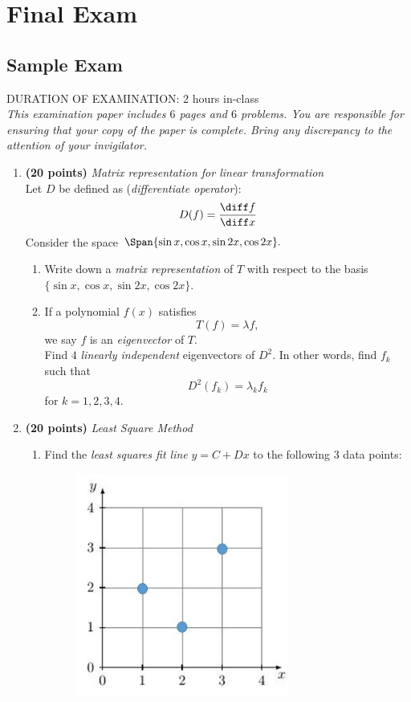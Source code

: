 

\chapter{Final Exam}

\section{Sample Exam}
DURATION OF EXAMINATION: 2 hours in-class\\
\textit{This examination paper includes $6$ pages and $6$ problems. You are responsible for ensuring that
your copy of the paper is complete. Bring any discrepancy to the attention of your invigilator.}\\
\begin{enumerate}
\item \textbf{(20 points)} \textit{Matrix representation for linear transformation}\\
Let $D$ be defined as (\textit{differentiate operator}):
\[
D(f)=\frac{\diff f}{\diff x}
\]
Consider the space $\Span\{\sin x,\cos x,\sin 2x,\cos 2x\}.$
\begin{enumerate}
\item
Write down a \textit{matrix representation} of $T$ with respect to the basis $\{\sin x,\cos x,\sin 2x,\cos 2x\}.$\\
\item
If a polynomial $f(x)$ satisfies
\[
T(f)=\lambda f,
\]
we say $f$ is an \textit{eigenvector} of $T$.\\
Find $4$ \textit{linearly independent} eigenvectors of $D^2$. In other words, find $f_k$ such that
\[
D^2(f_k)=\lambda_kf_k
\]
for $k=1,2,3,4$.
\end{enumerate}
\newpage
\item \textbf{(20 points)} \textit{Least Square Method}\\
\begin{enumerate}
\item
Find the \textit{least squares fit line} $y=C+Dx$ to the following 3 data points:
\begin{figure}[H]
\centering
\includegraphics[width=7cm]{exam/final/least_square}

\end{figure}
\end{enumerate}
\end{enumerate}

